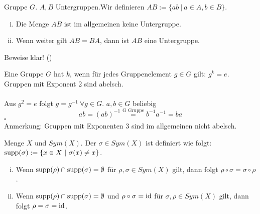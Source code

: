 Gruppe $G$. $A,B$ Untergruppen.Wir definieren $AB:=\{ab~|~a\in A,b \in B \}$.\\
\begin{enumerate}[(i)]
	\item Die Menge $AB$ ist im allgemeinen keine Untergruppe.
	\item Wenn weiter gilt $AB=BA$, dann ist $AB$ eine Untergruppe.
\end{enumerate}
Beweise klar! (\checkmark)

\newpage

\label{sub:zettel_2lga}
Eine Gruppe $G$ hat  $k$, wenn für jedes Gruppenelement $g\in G$ gilt: $g^k=e$.\\
\zz Gruppen mit Exponent 2 sind abelsch.\\

\\
Aus $g^2=e$ folgt $g=g^{-1}~\forall g\in G$. $a,b\in G$ beliebig\\
\[ ab=(ab)^{-1}\stackrel{\text{G Gruppe}}{=} b^{-1}a^{-1}=ba \]
\hfill $\square$\\
Anmerkung: Gruppen mit Exponenten 3 sind im allgemeinen nicht abelsch.

Menge $X$ und $Sym(X)$. Der  $\sigma \in Sym(X)$ ist definiert wie folgt: $\operatorname{supp}(\sigma):=\{x\in X~|~\sigma(x)\not=x \}$.
\begin{enumerate}[(i)]
	\item Wenn $\operatorname{supp}(\rho)\cap \operatorname{supp}(\sigma)=\emptyset$ für $\rho, \sigma \in Sym(X)$ gilt, dann folgt $\rho \circ \sigma=\sigma \circ \rho$.
	\item Wenn $\operatorname{supp}(\rho)\cap \operatorname{supp}(\sigma)=\emptyset$ und $\rho \circ \sigma=\operatorname{id}$ für $\sigma,\rho\in Sym(X)$ gilt, dann folgt $\rho=\sigma=\operatorname{id}$.
\end{enumerate}

